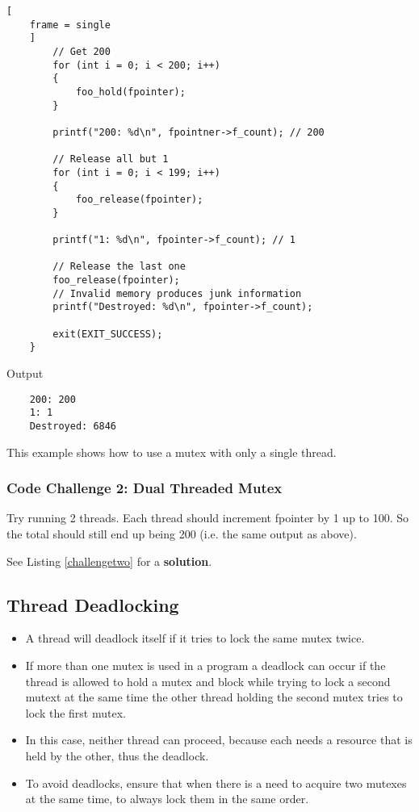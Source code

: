 \documentclass{article}
\begin{document}
\begin{lstlisting}[
    frame = single
    ]
        // Get 200
        for (int i = 0; i < 200; i++)
        {
            foo_hold(fpointer);
        }

        printf("200: %d\n", fpointner->f_count); // 200

        // Release all but 1
        for (int i = 0; i < 199; i++)
        {
            foo_release(fpointer);
        }

        printf("1: %d\n", fpointer->f_count); // 1
        
        // Release the last one
        foo_release(fpointer);
        // Invalid memory produces junk information
        printf("Destroyed: %d\n", fpointer->f_count);

        exit(EXIT_SUCCESS);
    }
\end{lstlisting}
{\Large Output}
\begin{verbatim}
    200: 200
    1: 1
    Destroyed: 6846
\end{verbatim}

This example shows how to use a mutex with only a single thread.

\clearpage
\subsubsection{Code Challenge 2: Dual Threaded Mutex}
Try running 2 threads. Each thread should increment fpointer by 1 up to 100. So the total should still end up being 200 (i.e. the same output as above).

See Listing \ref{challengetwo} for a \textbf{solution}.
\subsection{Thread Deadlocking}
\begin{itemize}
    \item A thread will deadlock itself if it tries to lock the same mutex twice.
    \item If more than one mutex is used in a program a deadlock can occur if the thread is allowed to hold a mutex and block while trying to lock a second mutext at the same time the other thread holding the second mutex tries to lock the first mutex.
    \item In this case, neither thread can proceed, because each needs a resource that is held by the other, thus the deadlock.
    \item To avoid deadlocks, ensure that when there is a need to acquire two mutexes at the same time, to always lock them in the same order.
\end{itemize}
\end{document}
